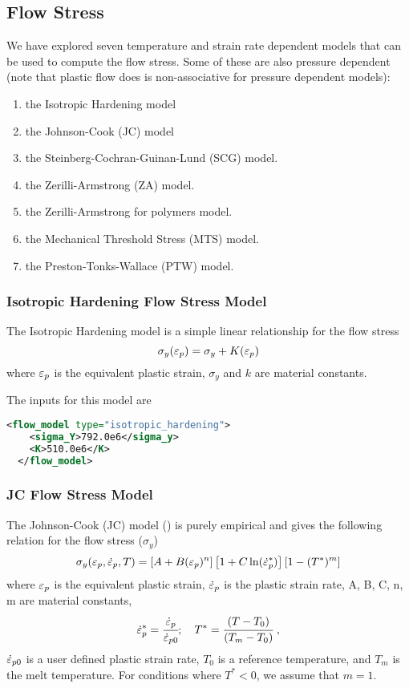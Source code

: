 \subsection{Flow Stress}
  We have explored seven temperature and strain rate dependent
  models that can be used to compute the flow stress.  Some of these are also
  pressure dependent (note that plastic flow does is non-associative for
  pressure dependent models):
  \begin{enumerate}
    \item the Isotropic Hardening model
    \item the Johnson-Cook (JC) model
    \item the Steinberg-Cochran-Guinan-Lund (SCG) model.
    \item the Zerilli-Armstrong (ZA) model.
    \item the Zerilli-Armstrong for polymers model.
    \item the Mechanical Threshold Stress (MTS) model.
    \item the Preston-Tonks-Wallace (PTW) model.
  \end{enumerate}

  \subsubsection{Isotropic Hardening Flow Stress Model}
  The Isotropic Hardening model is a simple linear relationship for the flow stress
  \begin{equation}
    \sigma_y(\varepsilon_p) = \sigma_y + K (\varepsilon_p)
  \end{equation}
  where $\varepsilon_p$ is the equivalent plastic strain, $\sigma_y$ and $k$ are material constants.

  The inputs for this model are
  \begin{lstlisting}[language=XML]
  <flow_model type="isotropic_hardening">
    <sigma_Y>792.0e6</sigma_y>
    <K>510.0e6</K>
  </flow_model>
  \end{lstlisting}

  \subsubsection{JC Flow Stress Model}
  The Johnson-Cook (JC) model (\cite{Johnson83}) is purely empirical and gives
  the following relation for the flow stress ($\sigma_y$)
  \begin{equation}
    \sigma_y(\varepsilon_p,\dot{\varepsilon}_{p},T) = 
    \left[A + B (\varepsilon_p)^n\right]\left[1 + C \ln(\dot{\varepsilon}_{p}^{*})\right]
    \left[1 - (T^*)^m\right]
  \end{equation}
  where $\varepsilon_p$ is the equivalent plastic strain, $\dot{\varepsilon}_{p}$ is the
  plastic strain rate, A, B, C, n, m are material constants,
  \begin{equation}
    \dot{\varepsilon}_{p}^{*} = \cfrac{\dot{\varepsilon}_{p}}{\dot{\varepsilon}_{p0}}; \quad
    T^* = \cfrac{(T-T_0)}{(T_m-T_0)}~,
  \end{equation}
  $\dot{\varepsilon}_{p0}$ is a user defined plastic strain rate,
  $T_0$ is a reference temperature, and $T_m$ is the melt temperature.
  For conditions where $T^* < 0$, we assume that $m = 1$.

